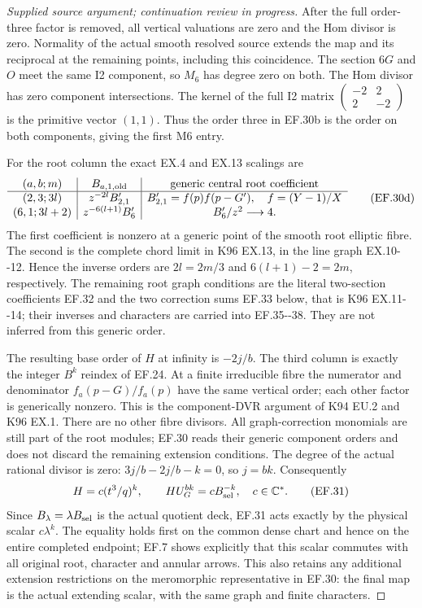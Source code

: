 \begin{proof}[Supplied source argument; continuation review in progress]
After the full order-three factor is removed, all vertical valuations
are zero and the Hom divisor is zero. Normality of the actual smooth
resolved source extends the map and its reciprocal at the remaining
points, including this coincidence.
The section \(6G\) and \(O\) meet the same I2 component, so \(M_6\)
has degree zero on both. The Hom divisor has zero component
intersections. The kernel of the full I2 matrix
\(\left(\begin{smallmatrix}-2&2\\2&-2\end{smallmatrix}\right)\)
is the primitive vector \((1,1)\). Thus the order three in EF.30b
is the order on both components, giving the first M6 entry.

For the root column the exact EX.4 and EX.13 scalings are
\[
 \begin{array}{c|c|c}
 (a,b;m)&B_{a,1,\rm old}&\text{generic central root coefficient}\\ \hline
 (2,3;3l)&z^{-2l}B'_{2,1}&
  B'_{2,1}=f(p)f(p-G'),\quad f=(Y-1)/X\\
 (6,1;3l+2)&z^{-6(l+1)}B'_6&
                         B'_6/z^2\longrightarrow4 .
 \end{array}                                                    \tag{EF.30d}
\]
The first coefficient is nonzero at a generic point of the smooth
root elliptic fibre. The second is the complete chord limit in K96
EX.13, in the line graph EX.10-\/-12. Hence the inverse orders are
\(2l=2m/3\) and \(6(l+1)-2=2m\), respectively. The remaining
root graph conditions are the literal two-section coefficients
EF.32 and the two correction sums EF.33 below, that is K96
EX.11-\/-14; their inverses and characters are carried into EF.35-\/-38.
They are not inferred from this generic order.

The resulting base order of \(H\) at infinity is \(-2j/b\).
The third column is exactly the integer \(B^k\) reindex of EF.24.
At a finite irreducible fibre the numerator and denominator
\(f_a(p-G)/f_a(p)\) have the same vertical order; each other
factor is generically nonzero. This is the component-DVR argument
of K94 EU.2 and K96 EX.1. There are no other fibre divisors.
All graph-correction
monomials are still part of the root modules; EF.30 reads their generic
component orders and does not discard the remaining extension
conditions. The degree of the actual rational divisor is zero:
\(3j/b-2j/b-k=0\), so \(j=bk\). Consequently
\[
 H=c(t^3/q)^k,\qquad H U_G^{bk}=c B_{\rm sel}^{-k},\quad
                                      c\in\mathbb C^*.
 \tag{EF.31}
\]
Since \(B_\lambda=\lambda B_{\rm sel}\) is the actual quotient
deck, EF.31 acts exactly by the physical scalar \(c\lambda^k\).
The equality holds first on the common dense chart and hence on the
entire completed endpoint; EF.7 shows explicitly that this scalar
commutes with all original root, character and annular arrows. This
also retains any additional extension restrictions on the meromorphic
representative in EF.30: the final map is the actual extending scalar,
with the same graph and finite characters.


\end{proof}
